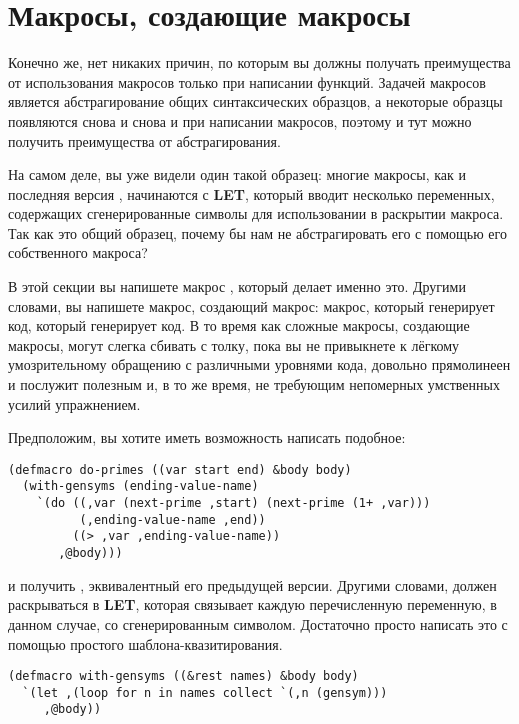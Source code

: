 \section{Макросы, создающие макросы}

Конечно же, нет никаких причин, по которым вы должны получать преимущества от
использования макросов только при написании функций. Задачей макросов является
абстрагирование общих синтаксических образцов, а некоторые образцы появляются снова и
снова и при написании макросов, поэтому и тут можно получить преимущества от
абстрагирования.

На самом деле, вы уже видели один такой образец: многие макросы, как и последняя версия
, начинаются с \textbf{LET}, который вводит несколько переменных,
содержащих сгенерированные символы для использовании в раскрытии макроса. Так как это
общий образец, почему бы нам не абстрагировать его с помощью его собственного макроса?

В этой секции вы напишете макрос , который делает именно это. Другими
словами, вы напишете макрос, создающий макрос: макрос, который генерирует код, который
генерирует код. В то время как сложные макросы, создающие макросы, могут слегка сбивать с
толку, пока вы не привыкнете к лёгкому умозрительному обращению с различными уровнями
кода,  довольно прямолинеен и послужит полезным и, в то же время, не
требующим непомерных умственных усилий упражнением.

Предположим, вы хотите иметь возможность написать подобное:

\begin{lstlisting}
(defmacro do-primes ((var start end) &body body)
  (with-gensyms (ending-value-name)
    `(do ((,var (next-prime ,start) (next-prime (1+ ,var)))
          (,ending-value-name ,end))
         ((> ,var ,ending-value-name))
       ,@body)))
\end{lstlisting}

и получить , эквивалентный его предыдущей версии. Другими словами,
 должен раскрываться в \textbf{LET}, которая связывает каждую
перечисленную переменную,  в данном случае, со сгенерированным
символом. Достаточно просто написать это с помощью простого шаблона-квазитирования.

\begin{lstlisting}
(defmacro with-gensyms ((&rest names) &body body)
  `(let ,(loop for n in names collect `(,n (gensym)))
     ,@body))
\end{lstlisting}

